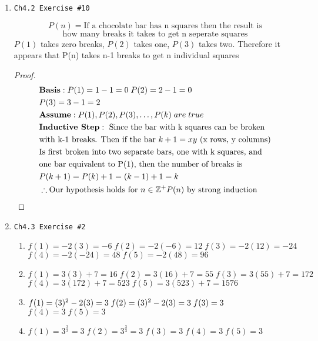 \documentclass[11pt]{article}
\begin{document}
\begin{enumerate}
    \item \begin{verbatim}Ch4.2 Exercise #10\end{verbatim}
        $$ P(n) = \text{If a chocolate bar has n squares then the result is} $$
        $$ \text{how many breaks it takes to get n seperate squares} $$
        $P(1)$ takes zero breaks, $P(2)$ takes one, $P(3)$ takes two. Therefore
        it appears that P(n) takes n-1 breaks to get n individual squares
        \begin{proof}
            \begin{align*}
                & \textbf{Basis}: P(1) = 1 - 1 = 0 \; P(2) = 2 - 1 = 0 \\
                & P(3) = 3 - 1 = 2 \\
                & \textbf{Assume}: P(1),P(2),P(3),\dots,P(k) \; are \; true \\
                & \textbf{Inductive Step}: \text{ Since the bar with k squares can be broken}\\
                & \text{with k-1 breaks. Then if the bar $k+1 = xy$ (x rows, y columns)} \\
                & \text{Is first broken into two separate bars, one with k squares, and} \\
                & \text{one bar equivalent to P(1), then the number of breaks is} \\
                & P(k+1) = P(k) + 1 = (k-1) + 1 = k \\
                & \therefore \text{Our hypothesis holds for $n\in\mathbb{Z}^+ P(n)$ by strong induction} \qedhere
            \end{align*}
        \end{proof}

    \newpage

    \item \begin{verbatim}Ch4.3 Exercise #2\end{verbatim}
        \begin{enumerate}
            \item $f(1) = -2(3) = -6 \; f(2) = -2(-6) = 12 \; f(3) = -2(12) = -24$
                $f(4) = -2(-24) = 48 \; f(5) = -2(48) = 96$
            \item $f(1) = 3(3)+7 = 16 \; f(2) = 3(16)+7 = 55 \; f(3) = 3(55)+7 = 172$
                $f(4) = 3(172)+7 = 523 \; f(5) = 3(523)+7 = 1576$
            \item $f(1) = (3)^2 - 2(3) = 3 \; f(2) = (3)^2 - 2(3) = 3 \; f(3) = 3\newline $
                $f(4) = 3 \; f(5) = 3$
            \item $f(1) = 3^{\frac{3}{3}} = 3 \; f(2) = 3^{\frac{3}{3}} = 3 \; f(3) = 3 \;f(4) = 3 \; f(5) = 3$
        \end{enumerate}
    

\end{enumerate}
\end{document}
